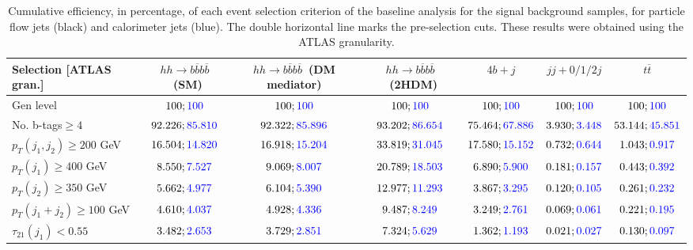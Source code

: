 \begin{landscape}
	\begin{table}
		\centering
		\caption{Cumulative efficiency, in percentage, of each event selection criterion of the baseline analysis for the signal background samples, for particle flow jets (black) and calorimeter jets (blue). The double horizontal line marks the pre-selection cuts. These results were obtained using the ATLAS granularity.}
		\begin{tabular}{lcccccc}
			\toprule 
			\textbf{Selection [ATLAS gran.]} & $hh\rightarrow b\overline{b}b\overline{b}$~(SM) & $hh\rightarrow b\overline{b}b\overline{b}$~(DM mediator) & $hh\rightarrow b\overline{b}b\overline{b}$~(2HDM) & $4b+j$  & $jj+0/1/2 j$ & $t\overline{t}$ \\
			\midrule
			Gen level & $100;\textcolor{blue}{100}$ & $100;\textcolor{blue}{100}$ &$100;\textcolor{blue}{100}$& $100;\textcolor{blue}{100}$& $100;\textcolor{blue}{100}$& $100;\textcolor{blue}{100}$ \\
			\rowcolor{black!7}No. b-tags$\geq 4$&$92.226;\textcolor{blue}{85.810}$&$92.322;\textcolor{blue}{85.896}$&$93.202;\textcolor{blue}{86.654}$&$75.464;\textcolor{blue}{67.886}$&$3.930;\textcolor{blue}{3.448}$&$53.144;\textcolor{blue}{45.851}$\\
			$p_T(j_1,j_2)\geq200$ GeV & $16.504;\textcolor{blue}{14.820}$ & $16.918;\textcolor{blue}{15.204}$&$33.819;\textcolor{blue}{31.045}$ &$17.580;\textcolor{blue}{15.152}$&$0.732;\textcolor{blue}{0.644}$&$1.043;\textcolor{blue}{0.917}$\\
			\midrule \midrule
			\rowcolor{black!7}$p_T(j_1)\geq 400$ GeV & $8.550;\textcolor{blue}{7.527}$ &$9.069;\textcolor{blue}{8.007}$  &$20.789;\textcolor{blue}{18.503}$&$6.890;\textcolor{blue}{5.900}$&$0.181;\textcolor{blue}{0.157}$&$0.443;\textcolor{blue}{0.392}$\\ 
			$p_T(j_2)\geq 350$ GeV & $5.662;\textcolor{blue}{4.977}$& $6.104;\textcolor{blue}{5.390}$&$12.977;\textcolor{blue}{11.293}$&$3.867;\textcolor{blue}{3.295}$&$0.120;\textcolor{blue}{0.105}$&$0.261;\textcolor{blue}{0.232}$\\
			\rowcolor{black!7}$p_T(j_1+j_2)\geq 100$ GeV &$4.610;\textcolor{blue}{4.037}$ & $4.928;\textcolor{blue}{4.336}$ &$9.487;\textcolor{blue}{8.249}$&$3.249;\textcolor{blue}{2.761}$&$0.069;\textcolor{blue}{0.061}$&$0.221;\textcolor{blue}{0.195}$\\
			$\tau_{21}(j_1)<0.55$ & $3.482;\textcolor{blue}{2.653}$& $3.729;\textcolor{blue}{2.851}$&$7.324;\textcolor{blue}{5.629}$&$1.362;\textcolor{blue}{1.193}$&$0.021;\textcolor{blue}{0.027}$&$0.130;\textcolor{blue}{0.097}$\\

\end{tabular}
\end{table}
\end{landscape}
